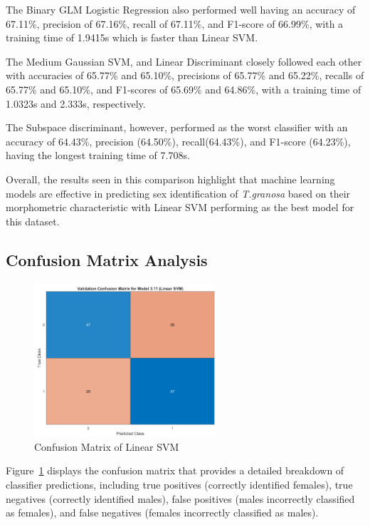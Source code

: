 The Binary GLM Logistic Regression also performed well having an accuracy of 67.11\%, precision of 67.16\%, recall of 67.11\%, and F1-score of 66.99\%, with a training time of 1.9415s which is faster than Linear SVM. 

The Medium Gaussian SVM, and Linear Discriminant closely followed each other with accuracies of 65.77\% and 65.10\%, precisions of 65.77\% and 65.22\%, recalls of 65.77\% and 65.10\%, and F1-scores of 65.69\% and 64.86\%, with a training time of 1.0323s and 2.333s, respectively. 

The Subspace discriminant, however, performed as the worst classifier with an accuracy of 64.43\%, precision (64.50\%), recall(64.43\%), and F1-score (64.23\%), having the longest training time of 7.708s. 

Overall, the results seen in this comparison highlight that machine learning models are effective in predicting sex identification of \textit{T.granosa} based on their morphometric characteristic with Linear SVM performing as the best model for this dataset. 


\subsection{Confusion Matrix Analysis}
\begin{figure}[!htbp]
	\centering
	\includegraphics[width=0.6\textwidth]{figures/confusion-matrix.png}
	\caption{Confusion Matrix of Linear SVM}
	\label{fig:confusion-matrix}
\end{figure}

Figure~\ref{fig:confusion-matrix} displays the confusion matrix that provides a detailed breakdown of classifier predictions, including true positives (correctly identified females), true negatives (correctly identified males), false positives (males incorrectly classified as females), and false negatives (females incorrectly classified as males).

